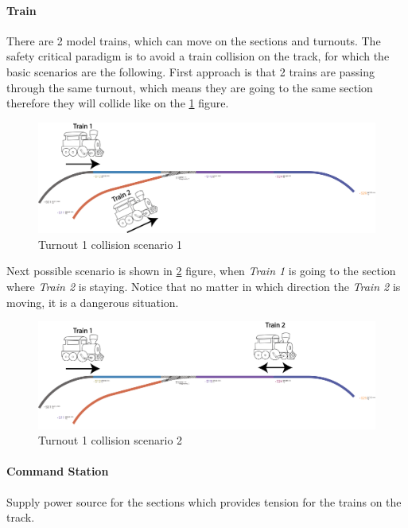 \paragraph{Train} \label{par:trainScenarios}
There are 2 model trains, which can move on the sections and turnouts. The safety critical paradigm is to avoid a train collision on the track, for which the basic scenarios are the following. 
First approach is that 2 trains are passing through the same turnout, which means they are going to the same section therefore they will collide like on the \ref{fig:LayoutT1-scenario1} figure.
\begin{figure}[!h]
	\centering
	\includegraphics[width=150mm, keepaspectratio]{figures/modes3/layoutT1-scenario1.png}
	\caption{Turnout 1 collision scenario 1}
	\label{fig:LayoutT1-scenario1}
\end{figure}
Next possible scenario is shown in \ref{fig:LayoutT1-scenario2} figure, when \textit{Train 1} is going to the section where \textit{Train 2} is staying. Notice that no matter in which direction the \textit{Train 2} is moving, it is a dangerous situation.
\begin{figure}[!h]
	\centering
	\includegraphics[width=150mm, keepaspectratio]{figures/modes3/layoutT1-scenario2.png}
	\caption{Turnout 1 collision scenario 2}
	\label{fig:LayoutT1-scenario2}
\end{figure}

\paragraph{Command Station}
Supply power source for the sections which provides tension for the trains on the track.
